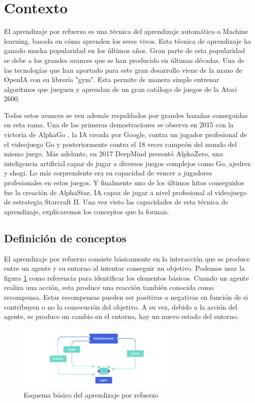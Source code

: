 \section{Contexto}

El aprendizaje por refuerzo es una técnica del aprendizaje automático o Machine learning, basada en cómo aprenden los seres vivos. Esta técnica de aprendizaje ha ganado mucha popularidad en los últimos años. Gran parte de esta popularidad se debe a los grandes avances que se han producido en últimas décadas. Una de las tecnologías que han aportado para este gran desarrollo viene de la mano de OpenIA \cite{openia} con su librería "gym". Esta permite de manera simple entrenar algoritmos que jueguen y aprendan de un gran catálogo de juegos de la Atari 2600. 

Todos estos avances se ven además respaldados por grandes hazañas conseguidas en esta rama. Una de las primeras demostraciones se observa en 2015 con la victoria de AlphaGo \cite{alphago}, la IA creada por Google, contra un jugador profesional de el videojuego Go y posteriormente contra el 18 veces campeón del mundo del mismo juego. Más adelante, en 2017 DeepMind \cite{deepmind} presentó AlphaZero, una inteligencia artificial capaz de jugar a diversos juegos complejos como Go, ajedrez y shogi. Lo más sorprendente era su capacidad de vencer a jugadores profesionales en estos juegos. Y finalmente uno de los últimos hitos conseguidos fue la creación de AlphaStar, IA capaz de jugar a nivel profesional al videojuego de estrategia Starcraft II. Una vez visto las capacidades de esta técnica de aprendizaje, explicaremos los conceptos que la forman.

\subsection{Definición de conceptos}

El aprendizaje por refuerzo consiste básicamente en la interacción que se produce entre un agente y su entorno al intentar conseguir un objetivo. Podemos usar la figura \ref {fig:esquema_RL} como referencia para identificar los elementos básicos. Cuando un agente realiza una acción, esta produce una reacción también conocida como recompensa. Estas recompensas pueden ser positivas o negativas en función de si contribuyen o no la consecución del objetivo. A su vez, debido a la acción del agente, se produce un cambio en el entorno, hay un nuevo estado del entorno.

\begin{figure}[h]
	\centering
	\includegraphics[width=0.7\textwidth]{img/esquema_RL.jpg}
	\caption{Esquema básico del aprendizaje por refuerzo \cite {RL_esquema}}
	\label{fig:esquema_RL}
\end{figure}

